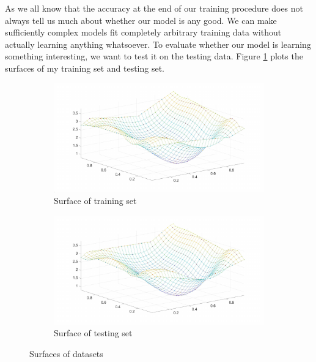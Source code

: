 \documentclass{article}
\begin{document}
As we all know that the accuracy at the end of our training procedure does not always tell us much about whether our model is any good. We can make sufficiently complex models fit completely arbitrary training data without actually learning anything whatsoever. To evaluate whether our model is learning something interesting, we want to test it on the testing data. Figure \ref{fig:trainsurface} plots the surfaces of my training set and testing set.

\begin{figure}[h!]
\begin{subfigure}[b]{.49\textwidth}
  \centering
  \includegraphics[width=\linewidth]{lab1/personaltrainsurface.pdf}
  \caption{Surface of training set}
  \label{fig:trainsurface}
\end{subfigure}
\hfill
\begin{subfigure}[b]{.49\textwidth}
  \centering
  \includegraphics[width=\linewidth]{lab1/personaltestsurface.pdf}
  \caption{Surface of testing set}
  \label{fig:testsurface}
\end{subfigure}
\caption{Surfaces of datasets}
\label{fig:fig}
\end{figure}
\end{document}
